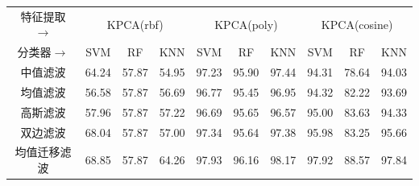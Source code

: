 \documentclass[12pt,hyperref,a4paper,UTF8]{ctexart}
\begin{document}
{\begin{table}[!h]
\begin{tabular}{@{}clllllllll@{}}
		\hline
		特征提取$\rightarrow$    & \multicolumn{3}{c}{KPCA(rbf)}                                              & \multicolumn{3}{c}{KPCA(poly)}                                             & \multicolumn{3}{c}{KPCA(cosine)}                                           \\
		分类器$\rightarrow$     & \multicolumn{1}{c}{SVM} & \multicolumn{1}{c}{RF} & \multicolumn{1}{c}{KNN} & \multicolumn{1}{c}{SVM} & \multicolumn{1}{c}{RF} & \multicolumn{1}{c}{KNN} & \multicolumn{1}{c}{SVM} & \multicolumn{1}{c}{RF} & \multicolumn{1}{c}{KNN} \\
		\hline
		中值滤波                 & 64.24                   & 57.87                  & 54.95                   & 97.23                   & 95.90                  & 97.44                   & 94.31                   & 78.64                  & 94.03                   \\
		均值滤波                 & 56.58                   & 57.87                  & 56.69                   & 96.77                   & 95.45                  & 96.95                   & 94.32                   & 82.22                  & 93.69                   \\
		高斯滤波                 & 57.96                   & 57.87                  & 57.22                   & 96.69                   & 95.65                  & 96.57                   & 95.00                   & 83.63                  & 94.33                   \\
		双边滤波                 & 68.04                   & 57.87                  & 57.00                   & 97.34                   & 95.64                  & 97.38                   & 95.98                   & 83.25                  & 95.66                   \\
		均值迁移滤波               & 68.85                   & 57.87                  & 64.26                   & 97.93                   & 96.16                  & 98.17                   & 97.92                   & 88.57                  & 97.84                  \\
		\hline
	\end{tabular}
\end{table}

\newpage


}
\end{document}
